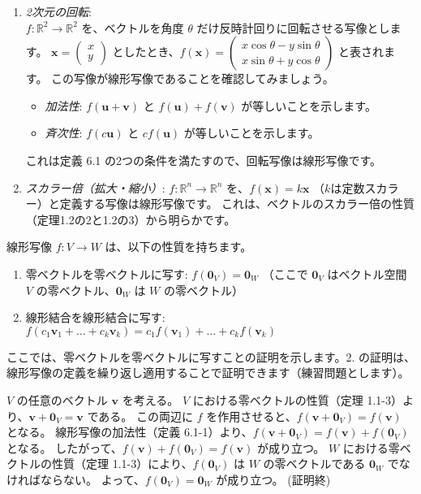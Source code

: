 \begin{ex}
\begin{enumerate}
\item \emph{2次元の回転}:\\
    $f: \mathbb{R}^2 \to \mathbb{R}^2$ を、ベクトルを角度 $\theta$ だけ反時計回りに回転させる写像とします。
    $\bm{x} = \begin{pmatrix} x \\ y \end{pmatrix}$ としたとき、$f(\bm{x}) = \begin{pmatrix} x\cos\theta - y\sin\theta \\ x\sin\theta + y\cos\theta \end{pmatrix}$ と表されます。
    この写像が線形写像であることを確認してみましょう。
	\begin{itemize}
	\item \emph{加法性}: $f(\bm{u} + \bm{v})$ と $f(\bm{u}) + f(\bm{v})$ が等しいことを示します。
    \item \emph{斉次性}: $f(c\bm{u})$ と $c f(\bm{u})$ が等しいことを示します。
    \end{itemize}
    これは定義 6.1 の2つの条件を満たすので、回転写像は線形写像です。
\item \emph{スカラー倍（拡大・縮小）}:
    $f: \mathbb{R}^n \to \mathbb{R}^n$ を、$f(\bm{x}) = k\bm{x}$ （$k$は定数スカラー）と定義する写像は線形写像です。
    これは、ベクトルのスカラー倍の性質（定理1.2の2と1.2の3）から明らかです。
\end{enumerate}
\end{ex}

\begin{thm}[線形写像の性質]
線形写像 $f: V \to W$ は、以下の性質を持ちます。
\begin{enumerate}
\item 零ベクトルを零ベクトルに写す: $f(\bm{0}_V) = \bm{0}_W$
    （ここで $\bm{0}_V$ はベクトル空間 $V$ の零ベクトル、$\bm{0}_W$ は $W$ の零ベクトル）
\item 線形結合を線形結合に写す: $f(c_1\bm{v}_1 + \dots + c_k\bm{v}_k) = c_1 f(\bm{v}_1) + \dots + c_k f(\bm{v}_k)$
\end{enumerate}
\begin{proof*}
ここでは、零ベクトルを零ベクトルに写すことの証明を示します。2. の証明は、線形写像の定義を繰り返し適用することで証明できます（練習問題とします）。\par
$V$ の任意のベクトル $\bm{v}$ を考える。
$V$ における零ベクトルの性質（定理 1.1-3）より、$\bm{v} + \bm{0}_V = \bm{v}$ である。
この両辺に $f$ を作用させると、$f(\bm{v} + \bm{0}_V) = f(\bm{v})$ となる。
線形写像の加法性（定義 6.1-1）より、$f(\bm{v} + \bm{0}_V) = f(\bm{v}) + f(\bm{0}_V)$ となる。
したがって、$f(\bm{v}) + f(\bm{0}_V) = f(\bm{v})$ が成り立つ。
$W$ における零ベクトルの性質（定理 1.1-3）により、$f(\bm{0}_V)$ は $W$ の零ベクトルである $\bm{0}_W$ でなければならない。
よって、$f(\bm{0}_V) = \bm{0}_W$ が成り立つ。
(証明終)
\end{proof*}
\end{thm}

